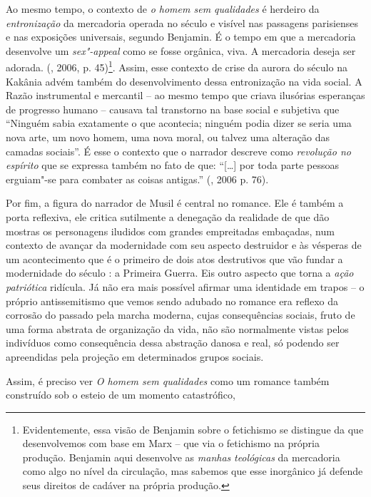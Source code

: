 {Ao mesmo tempo, o contexto de \emph{o homem sem qualidades} é herdeiro
da \emph{entronização} da mercadoria operada no século  e visível nas
passagens parisienses e nas exposições universais, segundo Benjamin. É o
tempo em que a mercadoria desenvolve um \emph{sex"-appeal} como se fosse
orgânica, viva. A mercadoria deseja ser adorada. (, 2006, p.
45)\footnote{Evidentemente, essa visão de Benjamin sobre o fetichismo se
  distingue da que desenvolvemos com base em Marx -- que via o
  fetichismo na própria produção. Benjamin aqui desenvolve as
  \emph{manhas} \emph{teológicas} da mercadoria como algo no nível da
  circulação, mas sabemos que esse inorgânico já defende seus direitos
  de cadáver na própria produção.}. Assim, esse contexto de crise da
aurora do século  na Kakânia advém também do desenvolvimento dessa
entronização na vida social. A Razão instrumental e mercantil -- ao
mesmo tempo que criava ilusórias esperanças de progresso humano --
causava tal transtorno na base social e subjetiva que ``Ninguém sabia
exatamente o que acontecia; ninguém podia dizer se seria uma nova arte,
um novo homem, uma nova moral, ou talvez uma alteração das camadas
sociais''. É esse o contexto que o narrador descreve como
\emph{revolução no espírito} que se expressa também no fato de que:
``[\ldots{}] por toda parte pessoas erguiam"-se para combater as coisas
antigas.'' (, 2006 p. 76).

Por fim, a figura do narrador de Musil é central no romance. Ele é
também a porta reflexiva, ele critica sutilmente a denegação da
realidade de que dão mostras os personagens iludidos com grandes
empreitadas embaçadas, num contexto de avançar da modernidade com seu
aspecto destruidor e às vésperas de um acontecimento que é o primeiro de
dois atos destrutivos que vão fundar a modernidade do século : a
Primeira Guerra. Eis outro aspecto que torna a \emph{ação patriótica}
ridícula. Já não era mais possível afirmar uma identidade em trapos -- o
próprio antissemitismo que vemos sendo adubado no romance era reflexo da
corrosão do passado pela marcha moderna, cujas consequências sociais,
fruto de uma forma abstrata de organização da vida, não são normalmente
vistas pelos indivíduos como consequência dessa abstração danosa e real,
só podendo ser apreendidas pela projeção em determinados grupos sociais.

Assim, é preciso ver \emph{O homem sem qualidades} como um romance
também construído sob o esteio de um momento catastrófico,

}
